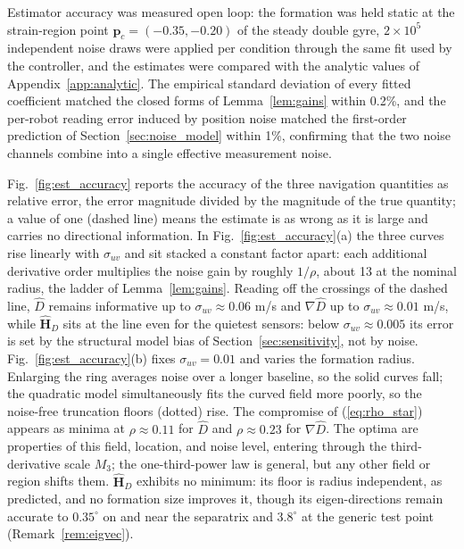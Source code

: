 \documentclass[lettersize,journal]{IEEEtran}
\begin{document}
Estimator accuracy was measured open loop: the formation was held static
at the strain-region point $\mathbf{p}_c = (-0.35, -0.20)$ of the steady
double gyre, $2 \times 10^5$ independent noise draws were applied per
condition through the same fit used by the controller, and the estimates
were compared with the analytic values of Appendix~\ref{app:analytic}.
The empirical standard deviation of every fitted coefficient matched the
closed forms of Lemma~\ref{lem:gains} within 0.2\%, and the per-robot
reading error induced by position noise matched the first-order
prediction of Section~\ref{sec:noise_model} within 1\%, confirming that
the two noise channels combine into a single effective measurement noise.

Fig.~\ref{fig:est_accuracy} reports the accuracy of the three navigation
quantities as relative error, the error magnitude divided by the
magnitude of the true quantity; a value of one (dashed line) means the
estimate is as wrong as it is large and carries no directional
information. In Fig.~\ref{fig:est_accuracy}(a) the three curves rise
linearly with $\sigma_{uv}$ and sit stacked a constant factor apart: each
additional derivative order multiplies the noise gain by roughly
$1/\rho$, about 13 at the nominal radius, the ladder of
Lemma~\ref{lem:gains}. Reading off the crossings of the dashed line,
$\hat{D}$ remains informative up to $\sigma_{uv} \approx 0.06$ m/s and
$\nabla\hat{D}$ up to $\sigma_{uv} \approx 0.01$ m/s, while
$\hat{\mathbf{H}}_D$ sits at the line even for the quietest sensors:
below $\sigma_{uv} \approx 0.005$ its error is set by the structural
model bias of Section~\ref{sec:sensitivity}, not by noise.
Fig.~\ref{fig:est_accuracy}(b) fixes $\sigma_{uv} = 0.01$ and varies the
formation radius. Enlarging the ring averages noise over a longer
baseline, so the solid curves fall; the quadratic model simultaneously
fits the curved field more poorly, so the noise-free truncation floors
(dotted) rise. The compromise of (\ref{eq:rho_star}) appears as minima
at $\rho \approx 0.11$ for $\hat{D}$ and $\rho \approx 0.23$ for
$\nabla\hat{D}$. The optima are properties of this field, location,
and noise level, entering through the third-derivative scale $M_3$;
the one-third-power law is general, but any other field or region
shifts them. $\hat{\mathbf{H}}_D$ exhibits no minimum: its floor is radius
independent, as predicted, and no formation size improves it, though its
eigen-directions remain accurate to $0.35^\circ$ on and near the
separatrix and $3.8^\circ$ at the generic test point
(Remark~\ref{rem:eigvec}).
\end{document}
